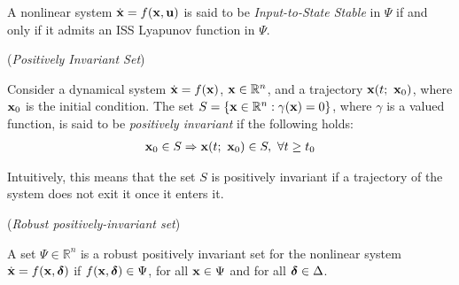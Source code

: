 \begin{theorem}\cite{marquez2003nonlinear}
\label{def:ISS_Lyapunov_admit_theorem}

  A nonlinear system $\dot{\bm{\mathbf{x}}} = f(\bm{\mathbf{x}},\bm{\mathbf{u}})$ is said
  to be \textit{Input-to-State Stable} in $\Psi$ if and only if it admits an
  ISS Lyapunov function in $\Psi$.
\\[2.5ex]
\end{theorem}


  \begin{definition} (\textit{Positively Invariant Set})
    \label{def:positively_invariant}

    Consider a dynamical system $\dot{\bm{\mathbf{x}}} = f(\bm{\mathbf{x}})$,
    $\bm{\mathbf{x}} \in \mathbb{R}^n$, and a trajectory $\bm{\mathbf{x}}(t;\ \bm{\mathbf{x}}_0)$,
    where $\bm{\mathbf{x}}_0$ is the initial condition. The set
    $S = \{\bm{\mathbf{x}} \in \mathbb{R}^n : \gamma(\bm{\mathbf{x}}) = 0\}$, where
    $\gamma$ is a valued function, is said to be \textit{positively invariant}
    if the following holds:
    \begin{align}
      \vect{x}_0 \in S \Rightarrow \vect{x}(t;\ \vect{x}_0) \in S,\ \forall t \geq t_0
    \end{align}

    Intuitively, this means that the set $S$ is positively invariant if a
    trajectory of the system does not exit it once it enters it. \\[2.5ex]
  \end{definition}


\begin{definition}\cite{ISS_SKATOLINI} (\textit{Robust positively-invariant set})
\label{def:robust_positively_invariant_set}

A set $\Psi \in \mathbb{R}^n$ is a robust positively invariant set for the
nonlinear system $\dot{\bm{\mathbf{x}}} = f(\bm{\mathbf{x}}, \bm{\mathbf{\delta}})$ if
$f(\bm{\mathbf{x}}, \bm{\mathbf{\delta}}) \in \Psi$, for all $\bm{\mathbf{x}} \in \Psi$ and for all
$\bm{\mathbf{\delta}} \in \Delta$.
\\[2.5ex]
\end{definition}


